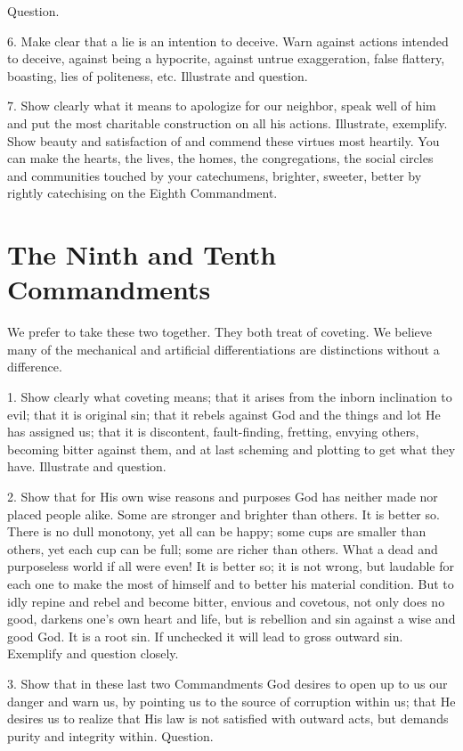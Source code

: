 Question.

6. Make clear that a lie is an intention to deceive. Warn against actions intended to deceive, against being a hypocrite, against untrue exaggeration, false flattery, boasting, lies of politeness, etc. Illustrate and question.

 7. Show clearly what it means to apologize for our neighbor, speak well of him and put the most charitable construction on all his actions. Illustrate, exemplify. Show beauty and satisfaction of and commend these virtues most heartily. You can make the hearts, the lives, the homes, the congregations, the social circles and communities touched by your catechumens, brighter, sweeter, better by rightly catechising on the Eighth Commandment.

\section{The Ninth and Tenth Commandments}

We prefer to take these two together. They both treat of coveting. We believe many of the mechanical and artificial differentiations are distinctions without a difference.

1. Show clearly what coveting means; that it
 arises from the inborn inclination to evil; that it is original sin; that it rebels against God and the things and lot He has assigned us; that it is discontent, fault-finding, fretting, envying others, becoming bitter against them, and at last scheming and plotting to get what they have. Illustrate and question.

2. Show that for His own wise reasons and purposes God has neither made nor placed people alike. Some are stronger and brighter than others. It is better so. There is no dull monotony, yet all can be happy; some cups are smaller than others, yet each cup can be full; some are richer than others. What a dead and purposeless world if all were even! It is better so; it is not wrong, but laudable for each one to make the most of himself and to better his material condition. But to idly repine and rebel and become bitter, envious and covetous, not only does no good, darkens one's own heart and life, but is rebellion and sin against a wise and good God. It is a root sin. If unchecked it will lead to gross outward sin. Exemplify and question closely.

3. Show that in these last two Commandments God desires to open up to us our danger and warn us, by pointing us to the source of corruption within us; that He desires us to realize that His law is not satisfied with outward acts, but demands purity and integrity within. Question.

